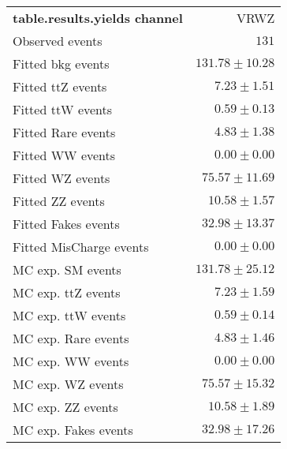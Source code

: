 

\begin{table}
\begin{center}
\setlength{\tabcolsep}{0.0pc}
{\small
\begin{tabular*}{\textwidth}{@{\extracolsep{\fill}}lr}
\noalign{\smallskip}\hline\noalign{\smallskip}
{\bf table.results.yields channel}           & VRWZ              \\[-0.05cm]
\noalign{\smallskip}\hline\noalign{\smallskip}
Observed events          & $131$                    \\
\noalign{\smallskip}\hline\noalign{\smallskip}
Fitted bkg events         & $131.78 \pm 10.28$              \\
\noalign{\smallskip}\hline\noalign{\smallskip}
        Fitted ttZ events         & $7.23 \pm 1.51$              \\
        Fitted ttW events         & $0.59 \pm 0.13$              \\
        Fitted Rare events         & $4.83 \pm 1.38$              \\
        Fitted WW events         & $0.00 \pm 0.00$              \\
        Fitted WZ events         & $75.57 \pm 11.69$              \\
        Fitted ZZ events         & $10.58 \pm 1.57$              \\
        Fitted Fakes events         & $32.98 \pm 13.37$              \\
        Fitted MisCharge events         & $0.00 \pm 0.00$              \\
 \noalign{\smallskip}\hline\noalign{\smallskip}
MC exp. SM events              & $131.78 \pm 25.12$              \\
\noalign{\smallskip}\hline\noalign{\smallskip}
        MC exp. ttZ events         & $7.23 \pm 1.59$              \\
        MC exp. ttW events         & $0.59 \pm 0.14$              \\
        MC exp. Rare events         & $4.83 \pm 1.46$              \\
        MC exp. WW events         & $0.00 \pm 0.00$              \\
        MC exp. WZ events         & $75.57 \pm 15.32$              \\
        MC exp. ZZ events         & $10.58 \pm 1.89$              \\
        MC exp. Fakes events         & $32.98 \pm 17.26$              \\

\end{tabular*}}
\end{center}
\end{table}
